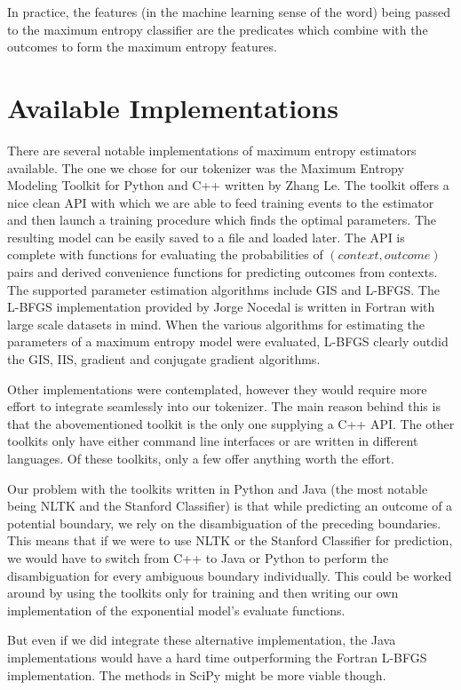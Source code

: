 In practice, the features (in the machine learning sense of the word) being
passed to the maximum entropy classifier are the predicates which combine with
the outcomes to form the maximum entropy features.

\section{Available Implementations}
\label{sec:maxent-impl}

There are several notable implementations of maximum entropy estimators
available. The one we chose for our tokenizer was the Maximum Entropy Modeling
Toolkit for Python and C++ written by Zhang Le. The toolkit offers a nice clean
API with which we are able to feed training events to the estimator and then
launch a training procedure which finds the optimal parameters. The resulting
model can be easily saved to a file and loaded later. The API is complete with
functions for evaluating the probabilities of $(context, outcome)$ pairs and
derived convenience functions for predicting outcomes from contexts. The
supported parameter estimation algorithms include GIS and L-BFGS. The L-BFGS
implementation provided by Jorge Nocedal is written in Fortran with large scale
datasets in mind. When the various algorithms for estimating the parameters of
a maximum entropy model were evaluated, L-BFGS clearly outdid the GIS, IIS,
gradient and conjugate gradient algorithms.

Other implementations were contemplated, however they would require more effort
to integrate seamlessly into our tokenizer. The main reason behind this is
that the abovementioned toolkit is the only one supplying a C++ API. The other
toolkits only have either command line interfaces or are written in different
languages. Of these toolkits, only a few offer anything worth the effort.

Our problem with the toolkits written in Python and Java (the most notable
being NLTK and the Stanford Classifier) is that while predicting an outcome of
a potential boundary, we rely on the disambiguation of the preceding
boundaries. This means that if we were to use NLTK or the Stanford Classifier
for prediction, we would have to switch from C++ to Java or Python to perform
the disambiguation for every ambiguous boundary individually. This could be
worked around by using the toolkits only for training and then writing our own
implementation of the exponential model's evaluate functions.

But even if we did integrate these alternative implementation, the Java
implementations would have a hard time outperforming the Fortran L-BFGS
implementation. The methods in SciPy might be more viable though.

